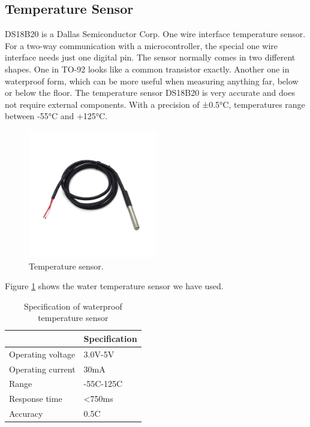 \subsection{Temperature Sensor}
DS18B20 is a Dallas Semiconductor Corp. One wire interface temperature sensor. For a two-way communication with a microcontroller, the special one wire interface needs just one digital pin. The sensor normally comes in two different shapes. One in TO-92 looks like a common transistor exactly. Another one in waterproof form, which can be more useful when measuring anything far, below or below the floor.
The temperature sensor DS18B20 is very accurate and does not require external components. With a precision of ±0.5°C, temperatures range between -55°C and +125°C.

\begin{figure}[h]
\centering
\includegraphics[width=0.5\textwidth]{figures/temperature_sensor.jpg}
\caption{Temperature sensor.}
\label{Temp1}
\end{figure}
Figure \ref{Temp1} shows the water temperature sensor we have used.


\begin{table}[H]
\centering
\caption{Specification of waterproof temperature sensor}
\begin{tabular}{|l|l|}
\hline
\multicolumn{1}{|c|}{\cellcolor[HTML]{FFFFFF}{\color[HTML]{333333} \textbf{Characteristics}}} & \textbf{Specification} \\ \hline
Operating voltage                                                                       & 3.0V-5V                \\ \hline
Operating current                                                                       & 30mA                   \\ \hline
Range                                                                                   & -55C-125C              \\ \hline
Response time                                                                            & \textless{}750ms       \\ \hline
Accuracy                                                                                & 0.5C                   \\ \hline
\end{tabular}
\end{table}

